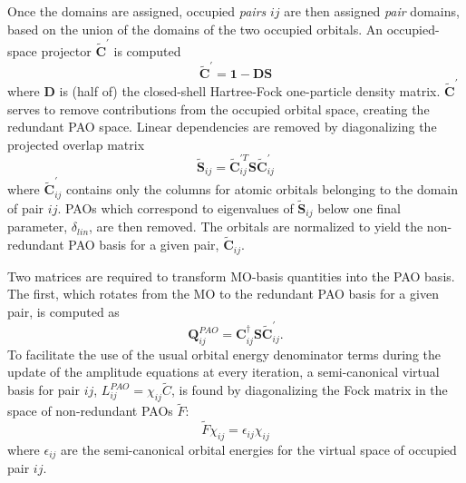 Once the domains are assigned, occupied \textit{pairs} $ij$ are then assigned \textit{pair} 
domains, based on the union of the domains of the two occupied orbitals. 
An occupied-space projector $\tilde{\textbf{C}}^\prime$ is computed  
\begin{equation}
    \tilde{\textbf{C}}^\prime = \textbf{1} - \textbf{DS}
\end{equation}
where $\textbf{D}$ is (half of) the closed-shell Hartree-Fock one-particle density matrix. 
$\tilde{\textbf{C}}^\prime$ serves to remove contributions from the occupied orbital space, creating
the redundant PAO space. Linear dependencies are removed by diagonalizing the projected 
overlap matrix
\begin{equation}
    \tilde{\textbf{S}}_{ij} = \tilde{\textbf{C}}^{\prime T}_{ij}\textbf{S}\tilde{\textbf{C}}^{\prime}_{ij}
\end{equation}
where $\tilde{\textbf{C}}^\prime_{ij}$ contains only the columns for atomic orbitals belonging to
the domain of pair ${ij}$. PAOs which correspond to eigenvalues of $\tilde{\textbf{S}}_{ij}$ 
below one final parameter, 
$\delta_{lin}$, are then removed.
The orbitals are normalized to yield the non-redundant PAO basis for a given pair, 
$\tilde{\textbf{C}}_{ij}$.

Two matrices are required to transform MO-basis quantities 
into the PAO basis. The first, which rotates from the MO to the redundant PAO
basis for a given pair, is computed as
\begin{equation} \label{eq:Q_pao}
    \textbf{Q}^{PAO}_{ij} = \textbf{C}^{\dagger}_{ij}\textbf{S}\tilde{\textbf{C}}^\prime_{ij}.
\end{equation}
To facilitate the use of the usual orbital energy denominator terms during the update of the 
amplitude equations at every iteration, a semi-canonical virtual basis for pair $ij$,
$L^{PAO}_{ij} = \chi_{ij}\tilde{C}$,
is found by diagonalizing the Fock matrix in the space of non-redundant PAOs $\tilde{F}$:
\begin{equation} \label{eq:L_pao}
    \tilde{F}\chi_{ij} = \epsilon_{ij}\chi_{ij}
\end{equation}
where $\epsilon_{ij}$ are the semi-canonical orbital energies for the virtual space of 
occupied pair $ij$. 

